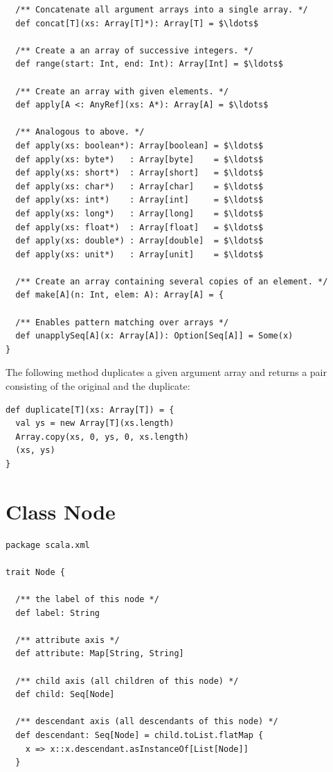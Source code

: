 {\begin{lstlisting}
  /** Concatenate all argument arrays into a single array. */
  def concat[T](xs: Array[T]*): Array[T] = $\ldots$

  /** Create a an array of successive integers. */
  def range(start: Int, end: Int): Array[Int] = $\ldots$

  /** Create an array with given elements. */
  def apply[A <: AnyRef](xs: A*): Array[A] = $\ldots$

  /** Analogous to above. */
  def apply(xs: boolean*): Array[boolean] = $\ldots$
  def apply(xs: byte*)   : Array[byte]    = $\ldots$
  def apply(xs: short*)  : Array[short]   = $\ldots$
  def apply(xs: char*)   : Array[char]    = $\ldots$
  def apply(xs: int*)    : Array[int]     = $\ldots$
  def apply(xs: long*)   : Array[long]    = $\ldots$
  def apply(xs: float*)  : Array[float]   = $\ldots$
  def apply(xs: double*) : Array[double]  = $\ldots$
  def apply(xs: unit*)   : Array[unit]    = $\ldots$

  /** Create an array containing several copies of an element. */
  def make[A](n: Int, elem: A): Array[A] = {

  /** Enables pattern matching over arrays */
  def unapplySeq[A](x: Array[A]): Option[Seq[A]] = Some(x)
}
\end{lstlisting}

\example The following method duplicates a given argument array and returns a pair consisting of the original and the duplicate:
\begin{lstlisting}
def duplicate[T](xs: Array[T]) = {
  val ys = new Array[T](xs.length)
  Array.copy(xs, 0, ys, 0, xs.length)
  (xs, ys)
}
\end{lstlisting}

\section{Class Node}\label{cls:Node}
\begin{lstlisting}
package scala.xml 

trait Node {

  /** the label of this node */
  def label: String               

  /** attribute axis */
  def attribute: Map[String, String] 

  /** child axis (all children of this node) */
  def child: Seq[Node]          

  /** descendant axis (all descendants of this node) */
  def descendant: Seq[Node] = child.toList.flatMap { 
    x => x::x.descendant.asInstanceOf[List[Node]] 
  } 


\end{lstlisting}}
